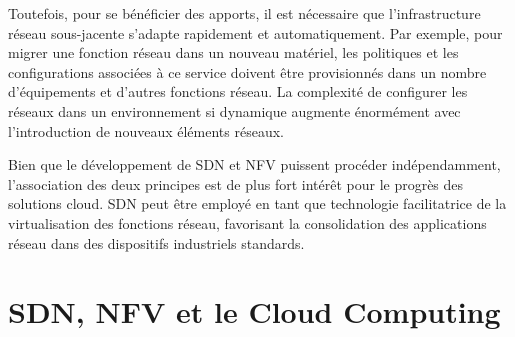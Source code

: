 Toutefois, pour se bénéficier des apports, il est nécessaire que l'infrastructure réseau sous-jacente s'adapte rapidement et automatiquement. Par exemple, pour migrer une fonction réseau  dans un nouveau matériel, les politiques et les configurations associées à ce service doivent être provisionnés dans un nombre d'équipements et d'autres fonctions réseau. La complexité de configurer les réseaux dans un environnement si dynamique augmente énormément avec l'introduction de nouveaux éléments réseaux.


Bien que le développement de SDN et NFV puissent procéder indépendamment, l'association des deux principes est de plus fort intérêt pour le progrès des solutions cloud. SDN peut être employé en tant que technologie facilitatrice de la virtualisation des fonctions réseau, favorisant la consolidation des applications réseau dans des dispositifs industriels standards. 





\section{SDN, NFV et le Cloud Computing}

